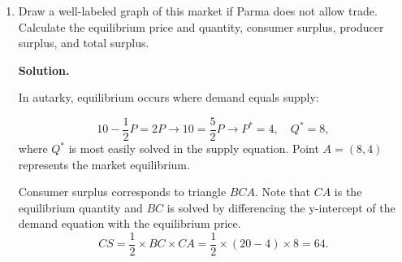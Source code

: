 \documentclass[12pt]{article}
\newenvironment{solution}{\par\noindent\textbf{Solution.}\par}{\vspace{1em}}
\begin{document}
\begin{enumerate}[label=(\alph*)]

\item Draw a well-labeled graph of this market if Parma does not allow trade. 
Calculate the equilibrium price and quantity, consumer surplus, producer surplus, 
and total surplus.
\begin{solution}

\begin{center}
\end{center}

In autarky, equilibrium occurs where demand equals supply:

$$
10-\frac{1}{2}P = 2P \rightarrow 10=\frac{5}{2}P \rightarrow P^*=4,\quad Q^*=8,
$$
where $Q^*$ is most easily solved in the supply equation. Point $A=(8,4)$ represents the market equilibrium.

\medskip

Consumer surplus corresponds to triangle $BCA$. Note that $CA$ is the equilibrium quantity and $BC$ is solved by differencing the y-intercept of the demand equation with the equilibrium price.
$$
CS = \frac{1}{2}\times BC \times CA = \frac{1}{2}\times(20-4)\times 8 = 64.
$$

\medskip


\end{solution}
\end{enumerate}
\end{document}
